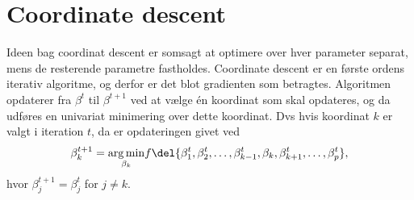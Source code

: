 \section{Coordinate descent}
Ideen bag coordinat descent er somsagt at optimere over hver parameter separat, mens de resterende parametre fastholdes.
Coordinate descent er en første ordens iterativ algoritme, og derfor er det blot gradienten som betragtes.
Algoritmen opdaterer fra \(\beta^t\) til \(\beta^{t+1}\) ved at vælge én koordinat som skal opdateres, og da udføres en univariat minimering over dette koordinat.
Dvs hvis koordinat $k$ er valgt i iteration $t$, da er opdateringen givet ved
\begin{align}
\beta_k^{t+1} =\underset{ \beta_k}{\arg \min}  f\del{ \beta_1^t, \beta_2^t, \dots, \beta_{k-1}^t, \beta_k, \beta_{k+1}^t, \dots, \beta_p^t  }, \label{eq:5.36}
\end{align}
hvor $\beta_j^{t+1} = \beta_j^t$ for $j \neq k$. 
%

